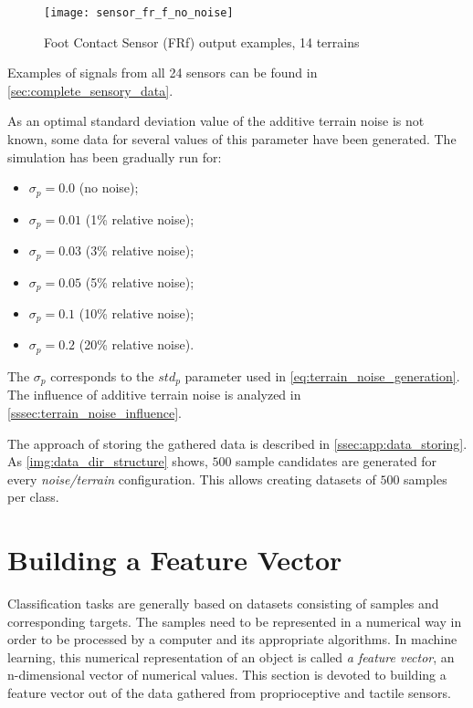 \begin{figure}[H]
  \centering
  \texttt{[image: sensor\_fr\_f\_no\_noise]}
  \caption{Foot Contact Sensor (FRf) output examples, 14 terrains}
  \label{fig:sensor_fr_f_no_noise}
\end{figure}

Examples of signals from all 24 sensors can be found in \cref{sec:complete_sensory_data}.

As an optimal standard deviation value of the additive terrain noise is not known, some data for several values of this parameter have been generated. The simulation has been gradually run for:

\begin{itemize}
\item $ \sigma_p = 0.0 $ (no noise);
\item $ \sigma_p = 0.01 $ (1\% relative noise);
\item $ \sigma_p = 0.03 $ (3\% relative noise);
\item $ \sigma_p = 0.05 $ (5\% relative noise);
\item $ \sigma_p = 0.1 $ (10\% relative noise);
\item $ \sigma_p = 0.2 $ (20\% relative noise).
\end{itemize}

The $ \sigma_p $ corresponds to the $ std_p $ parameter used in \cref{eq:terrain_noise_generation}. The influence of additive terrain noise is analyzed in \cref{sssec:terrain_noise_influence}.

The approach of storing the gathered data is described in \cref{ssec:app:data_storing}. As \cref{img:data_dir_structure} shows, $ 500 $ sample candidates are generated for every \textit{noise/terrain} configuration. This allows creating datasets of $ 500 $ samples per class.

\section{Building a Feature Vector} \label{sec:feature_vector_compilation}
Classification tasks are generally based on datasets consisting of samples and corresponding targets. The samples need to be represented in a numerical way in order to be processed by a computer and its appropriate algorithms. In machine learning, this numerical representation of an object is called \textit{a feature vector}, an n-dimensional vector of numerical values. This section is devoted to building a feature vector out of the data gathered from proprioceptive and tactile sensors.

